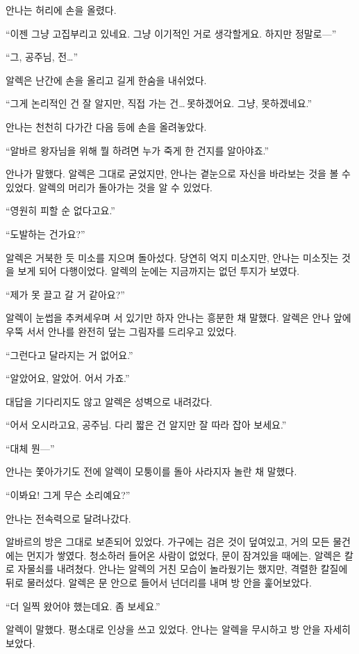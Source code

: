 안나는 허리에 손을 올렸다.

``이젠 그냥 고집부리고 있네요. 그냥 이기적인 거로 생각할게요. 하지만 정말로—''

``그, 공주님, 전\ldots''

알렉은 난간에 손을 올리고 길게 한숨을 내쉬었다.

``그게 논리적인 건 잘 알지만, 직접 가는 건\ldots\,못하겠어요. 그냥, 못하겠네요.''

안나는 천천히 다가간 다음 등에 손을 올려놓았다.

``알바르 왕자님을 위해 뭘 하려면 누가 죽게 한 건지를 알아야죠.''

안나가 말했다. 알렉은 그대로 굳었지만, 안나는 곁눈으로 자신을 바라보는 것을 볼 수 있었다. 알렉의 머리가 돌아가는 것을 알 수 있었다.

``영원히 피할 순 없다고요.''

`` 도발하는 건가요?''

알렉은 거북한 듯 미소를 지으며 돌아섰다. 당연히 억지 미소지만, 안나는 미소짓는 것을 보게 되어 다행이었다. 알렉의 눈에는 지금까지는 없던 투지가 보였다.

``제가 못 끌고 갈 거 같아요?''

알렉이 눈썹을 추켜세우며 서 있기만 하자 안나는 흥분한 채 말했다. 알렉은 안나 앞에 우뚝 서서 안나를 완전히 덮는 그림자를 드리우고 있었다.

``그런다고 달라지는 거 없어요.''

``알았어요, 알았어. 어서 가죠.''

대답을 기다리지도 않고 알렉은 성벽으로 내려갔다.

``어서 오시라고요, 공주님. 다리 짧은 건 알지만 잘 따라 잡아 보세요.''

``대체 뭔—''

안나는 쫓아가기도 전에 알렉이 모퉁이를 돌아 사라지자 놀란 채 말했다.

``이봐요! 그게 무슨 소리예요?''

안나는 전속력으로 달려나갔다.

\textbreak

알바르의 방은 그대로 보존되어 있었다. 가구에는 검은 것이 덮여있고, 거의 모든 물건에는 먼지가 쌓였다. 청소하러 들어온 사람이 없었다, 문이 잠겨있을 때에는. 알렉은 칼로 자물쇠를 내려쳤다. 안나는 알렉의 거친 모습이 놀라웠기는 했지만, 격렬한 칼질에 뒤로 물러섰다. 알렉은 문 안으로 들어서 넌더리를 내며 방 안을 훑어보았다.

``더 일찍 왔어야 했는데요. 좀 보세요.''

알렉이 말했다. 평소대로 인상을 쓰고 있었다. 안나는 알렉을 무시하고 방 안을 자세히 보았다.

